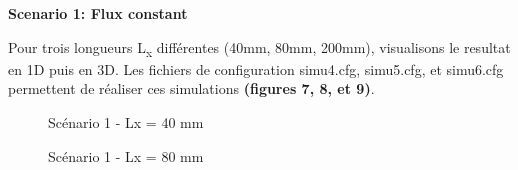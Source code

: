 \documentclass[11pt]{article} %
\begin{document}
		\begin{center}
			\textbf{Scenario 1: Flux constant}
		\end{center}
\par Pour trois longueurs L\textsubscript x différentes (40mm, 80mm, 200mm), visualisons le resultat en 1D puis en 3D. Les fichiers de configuration simu\textunderscore4.cfg, simu\textunderscore5.cfg, et simu\textunderscore6.cfg permettent de réaliser ces simulations \textbf{(figures 7, 8, et 9)}. 
			\begin{figure}[!htb]
				\centering
				\qquad
				\caption{Scénario 1 - Lx = 40 mm}%

				\centering
				\qquad
				\caption{Scénario 1 - Lx = 80 mm}%


\end{figure}
\end{document}
